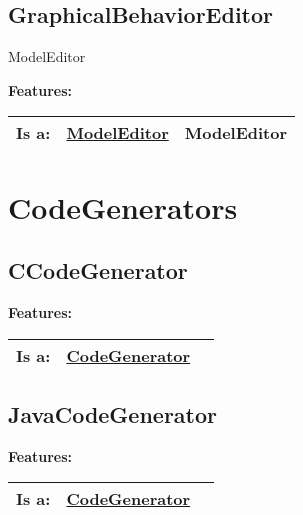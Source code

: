 		
	\vspace{\baselineskip}
	\vspace{\baselineskip}
	\vspace{\baselineskip}
	\subsection{GraphicalBehaviorEditor}
	ModelEditor
	
	
	\begingroup
	\textbf{Features:}
	\renewcommand{\arraystretch}{1.8} %
	\begin{longtable}{l|l p{}}
		\hline
	Is a: & \tabitem \hyperlink{ref:ModelEditor}{ModelEditor}  & ModelEditor\\
	\hline
	\end{longtable}
	\endgroup
	
\section{CodeGenerators}
	
	
	\subsection{CCodeGenerator}
	
	
	\begingroup
	\textbf{Features:}
	\renewcommand{\arraystretch}{1.8} %
	\begin{longtable}{l|l p{}}
		\hline
	Is a: & \tabitem \hyperlink{ref:CodeGenerator}{CodeGenerator}  & \\
	\hline
	\end{longtable}
	\endgroup
	
	\subsection{JavaCodeGenerator}
	
	
	\begingroup
	\textbf{Features:}
	\renewcommand{\arraystretch}{1.8} %
	\begin{longtable}{l|l p{}}
		\hline
	Is a: & \tabitem \hyperlink{ref:CodeGenerator}{CodeGenerator}  & \\
	\hline
	\end{longtable}
	\endgroup
	

